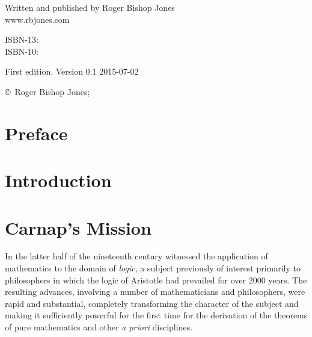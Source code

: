 \begin{titlepage}
\maketitle

\hspace{2in}

\vfill

\begin{centering}

{\small

Written and published by Roger Bishop Jones\\
www.rbjones.com\\

\vspace{0.2in}

ISBN-13: \\
ISBN-10: 

\vspace{0.2in}

}%
{\scriptsize

First edition. \hfil Version 0.1 \hfil 2015-07-02

\vspace{0.2in}

\copyright\ Roger Bishop Jones;

}%

\end{centering}

\thispagestyle{empty}

\end{titlepage}

{\parskip=0pt\tableofcontents}


\chapter*{Preface}\label{Preface}

\mainmatter

\chapter{Introduction}

\chapter{Carnap's Mission}

In the latter half of the nineteenth century witnessed the application of mathematics
to the domain of \emph{logic}, a subject previously of interest primarily to philosophers
in which the logic of Aristotle had prevailed for over 2000 years.
The resulting advances, involving a number of mathematicians and philosophers, were rapid and substantial,
completely transforming the character of the subject and making it sufficiently powerful for the first
time for the derivation of the theorems of pure mathematics and other \emph{a priori} disciplines.  

